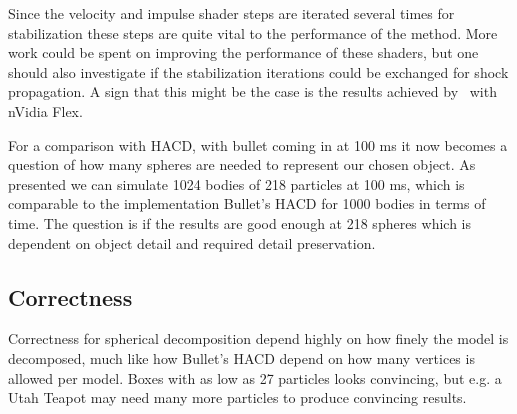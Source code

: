 Since the velocity and impulse shader steps are iterated
several times for stabilization these steps are quite vital to the performance
of the method. More work could be spent on improving the performance of these shaders,
but one should also investigate if the stabilization iterations could be exchanged for
shock propagation. A sign that this might be the case is the results achieved by~\cite{flex} with nVidia Flex.

For a comparison with HACD, with bullet coming in at 100 ms it now becomes
a question of how many spheres are needed to represent our chosen object.
As presented we can simulate 1024 bodies of 218 particles at 100 ms, which is comparable to
 the implementation Bullet's HACD for 1000 bodies in terms of time. The question is
 if the results are good enough at 218 spheres which is dependent on object detail
 and required detail preservation.

\subsection{Correctness}
Correctness for spherical decomposition depend highly on how finely the model is
decomposed, much like how Bullet's HACD depend on how many vertices is allowed
per model. Boxes with as low as 27 particles looks convincing, but e.g. a Utah Teapot
may need many more particles to produce convincing results.
